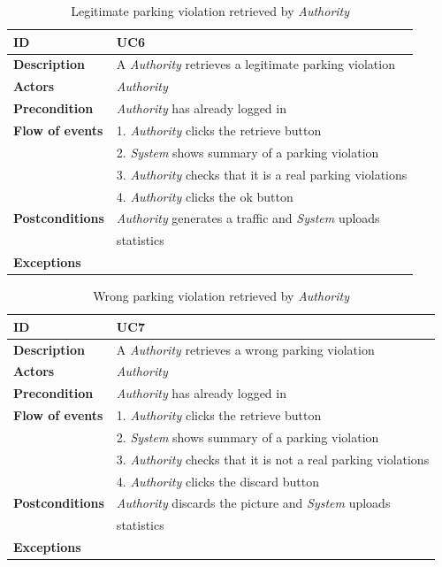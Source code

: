 \documentclass{article}
\begin{document}
\clearpage
\begin{table}
    \begin{center}
    \centering
\begin{tabular}{ | l | l |}
\hline
\textbf{ID} & UC6 \\
\hline
\textbf{Description} & A \textit{Authority} retrieves a legitimate parking violation  \\
\hline
\textbf{Actors} & \textit{Authority} \\
\hline
\textbf{Precondition} & \textit{Authority} has already logged in \\
\hline
\textbf{Flow of events} & 1. \textit{Authority} clicks the retrieve button \\
                        & 2. \textit{System} shows summary of a parking violation \\
                        & 3. \textit{Authority} checks that it is a real parking violations  \\
                        & 4. \textit{Authority} clicks the ok button  \\
\hline
\textbf{Postconditions} &  \textit{Authority} generates a traffic and \textit{System} uploads \\ 
                        & statistics \\
\hline
\textbf{Exceptions} & \\ 
\hline
\end{tabular}
\caption{Legitimate parking violation retrieved by \textit{Authority} }
\end{center}
\end{table}

\clearpage
\begin{table}
    \begin{center}
    \centering
\begin{tabular}{ | l | l |}
\hline
\textbf{ID} & UC7 \\
\hline
\textbf{Description} & A \textit{Authority} retrieves a  wrong parking violation  \\
\hline
\textbf{Actors} & \textit{Authority} \\
\hline
\textbf{Precondition} & \textit{Authority} has already logged in \\
\hline
\textbf{Flow of events} & 1. \textit{Authority} clicks the retrieve button \\
                        & 2. \textit{System} shows summary of a parking violation \\
                        & 3. \textit{Authority} checks that it is not a real parking violations \\
                        & 4. \textit{Authority} clicks the discard button  \\
\hline
\textbf{Postconditions} & \textit{Authority} discards the picture and \textit{System} uploads   \\
                        &  statistics \\
\hline
\textbf{Exceptions} & \\ 
\hline
\end{tabular}
\caption{Wrong parking violation retrieved by \textit{Authority} }
\end{center}
\end{table}
\end{document}
